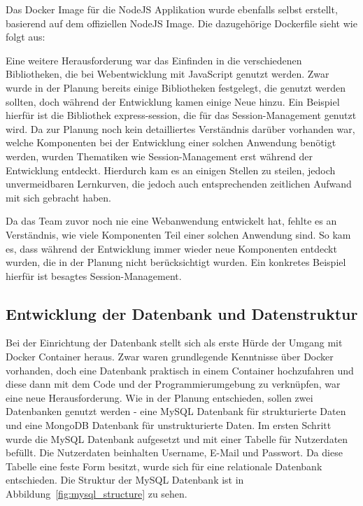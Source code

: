 \vspace{1em}

\vspace{1em}

Das Docker Image für die NodeJS Applikation wurde ebenfalls selbst erstellt, basierend auf dem offiziellen NodeJS Image.
Die dazugehörige Dockerfile sieht wie folgt aus:

\vspace{1em}

\vspace{1em}

Eine weitere Herausforderung war das Einfinden in die verschiedenen Bibliotheken, die bei Webentwicklung mit JavaScript genutzt werden.
Zwar wurde in der Planung bereits einige Bibliotheken festgelegt, die genutzt werden sollten, doch während der Entwicklung kamen einige Neue hinzu.
Ein Beispiel hierfür ist die Bibliothek express-session, die für das Session-Management genutzt wird.
Da zur Planung noch kein detailliertes Verständnis darüber vorhanden war, welche Komponenten bei der Entwicklung einer solchen Anwendung benötigt werden, wurden Thematiken wie Session-Management erst während der Entwicklung entdeckt.
Hierdurch kam es an einigen Stellen zu steilen, jedoch unvermeidbaren Lernkurven, die jedoch auch entsprechenden zeitlichen Aufwand mit sich gebracht haben.

Da das Team zuvor noch nie eine Webanwendung entwickelt hat, fehlte es an Verständnis, wie viele Komponenten Teil einer solchen Anwendung sind.
So kam es, dass während der Entwicklung immer wieder neue Komponenten entdeckt wurden, die in der Planung nicht berücksichtigt wurden.
Ein konkretes Beispiel hierfür ist besagtes Session-Management.

\subsection{Entwicklung der Datenbank und Datenstruktur}\label{subsec:entwicklung-der-datenbank-und-datenstruktur}

Bei der Einrichtung der Datenbank stellt sich als erste Hürde der Umgang mit Docker Container heraus.
Zwar waren grundlegende Kenntnisse über Docker vorhanden, doch eine Datenbank praktisch in einem Container hochzufahren und diese dann mit dem Code und der Programmierumgebung zu verknüpfen, war eine neue Herausforderung.
Wie in der Planung entschieden, sollen zwei Datenbanken genutzt werden - eine MySQL Datenbank für strukturierte Daten und eine MongoDB Datenbank für unstrukturierte Daten.
Im ersten Schritt wurde die MySQL Datenbank aufgesetzt und mit einer Tabelle für Nutzerdaten befüllt.
Die Nutzerdaten beinhalten Username, E-Mail und Passwort.
Da diese Tabelle eine feste Form besitzt, wurde sich für eine relationale Datenbank entschieden.
Die Struktur der MySQL Datenbank ist in Abbildung~\ref{fig:mysql_structure} zu sehen.

